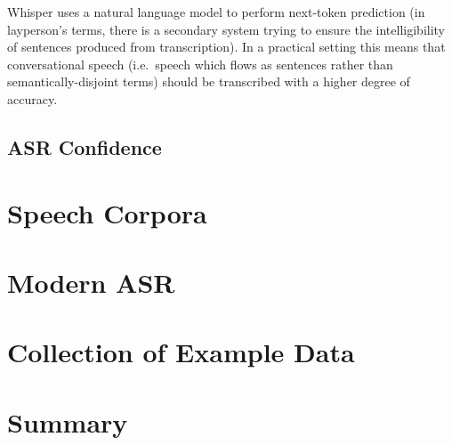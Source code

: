 Whisper uses a natural language model to perform next-token prediction (in layperson's terms, there is a secondary system trying to ensure the intelligibility of sentences produced from transcription).
In a practical setting this means that conversational speech (i.e.\ speech which flows as sentences rather than semantically-disjoint terms) should be transcribed with a higher degree of accuracy.

\subsection{ASR Confidence}

\section{Speech Corpora}\label{sec:} 


\section{Modern ASR}\label{sec:modern-asr}


\section{Collection of Example Data}\label{sec:}
\section{}\label{sec:}
\section{}\label{sec:}
\section{}\label{sec:}

\section{Summary}\label{sec:lit-survey-summary}

